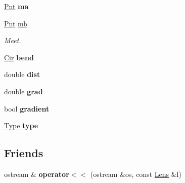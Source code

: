 \begin{DoxyCompactItemize}
\item 
\hypertarget{structvsr_1_1_lens_a4306f7cca15713ba87db713146325967}{\hyperlink{namespacevsr_a2d05beb9721c5d9211b479af6d47222d}{Pnt} {\bfseries ma}}\label{structvsr_1_1_lens_a4306f7cca15713ba87db713146325967}

\item 
\hypertarget{structvsr_1_1_lens_aee61e99ba809125bb10a78e467caeeda}{\hyperlink{namespacevsr_a2d05beb9721c5d9211b479af6d47222d}{Pnt} \hyperlink{structvsr_1_1_lens_aee61e99ba809125bb10a78e467caeeda}{mb}}\label{structvsr_1_1_lens_aee61e99ba809125bb10a78e467caeeda}

\begin{DoxyCompactList}\small\item\em Meet. \end{DoxyCompactList}\item 
\hypertarget{structvsr_1_1_lens_abd1d1b2e6878a2a9e489b7d82d4ec8ba}{\hyperlink{namespacevsr_a2744605aa828e495fc85463b7ae0d045}{Cir} {\bfseries bend}}\label{structvsr_1_1_lens_abd1d1b2e6878a2a9e489b7d82d4ec8ba}

\item 
\hypertarget{structvsr_1_1_lens_af80cf479aed6ebf761e321f42e3ac9f8}{double {\bfseries dist}}\label{structvsr_1_1_lens_af80cf479aed6ebf761e321f42e3ac9f8}

\item 
\hypertarget{structvsr_1_1_lens_a277b471177673807d6be7cdddce7f5ca}{double {\bfseries grad}}\label{structvsr_1_1_lens_a277b471177673807d6be7cdddce7f5ca}

\item 
\hypertarget{structvsr_1_1_lens_afd274940b74cbb7942f734a684df2257}{bool {\bfseries gradient}}\label{structvsr_1_1_lens_afd274940b74cbb7942f734a684df2257}

\item 
\hypertarget{structvsr_1_1_lens_a482f8150f36f4f9ea099eee47e05201a}{\hyperlink{structvsr_1_1_lens_a1f4790f546826245cbcd28827a9cf391}{Type} {\bfseries type}}\label{structvsr_1_1_lens_a482f8150f36f4f9ea099eee47e05201a}

\end{DoxyCompactItemize}
\subsection*{Friends}
\begin{DoxyCompactItemize}
\item 
\hypertarget{structvsr_1_1_lens_a4d2055f8976cd8956676797e7062d874}{ostream \& {\bfseries operator$<$$<$} (ostream \&os, const \hyperlink{structvsr_1_1_lens}{Lens} \&l)}\label{structvsr_1_1_lens_a4d2055f8976cd8956676797e7062d874}

\end{DoxyCompactItemize}


